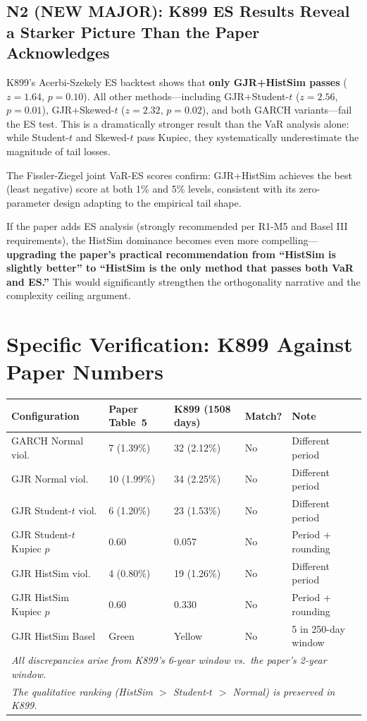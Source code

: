 \documentclass[12pt,a4paper]{article}
\begin{document}
\subsection*{\textcolor{warncolor}{N2 (NEW MAJOR): K899 ES Results Reveal a Starker Picture Than the Paper Acknowledges}}

K899's Acerbi-Szekely ES backtest shows that \textbf{only GJR+HistSim passes} ($z = 1.64$, $p = 0.10$). All other methods---including GJR+Student-$t$ ($z = 2.56$, $p = 0.01$), GJR+Skewed-$t$ ($z = 2.32$, $p = 0.02$), and both GARCH variants---fail the ES test. This is a dramatically stronger result than the VaR analysis alone: while Student-$t$ and Skewed-$t$ pass Kupiec, they systematically underestimate the magnitude of tail losses.

The Fissler-Ziegel joint VaR-ES scores confirm: GJR+HistSim achieves the best (least negative) score at both 1\% and 5\% levels, consistent with its zero-parameter design adapting to the empirical tail shape.

If the paper adds ES analysis (strongly recommended per R1-M5 and Basel III requirements), the HistSim dominance becomes even more compelling---\textbf{upgrading the paper's practical recommendation from ``HistSim is slightly better'' to ``HistSim is the only method that passes both VaR and ES.''} This would significantly strengthen the orthogonality narrative and the complexity ceiling argument.


\bigskip

\section*{Specific Verification: K899 Against Paper Numbers}

\begin{longtable}{p{3.5cm}p{2.5cm}p{2.5cm}p{2cm}p{3cm}}
\toprule
\textbf{Configuration} & \textbf{Paper Table~5} & \textbf{K899 (1508 days)} & \textbf{Match?} & \textbf{Note} \\
\midrule
\endfirsthead
GARCH Normal viol. & 7 (1.39\%) & 32 (2.12\%) & No & Different period \\
GJR Normal viol. & 10 (1.99\%) & 34 (2.25\%) & No & Different period \\
GJR Student-$t$ viol. & 6 (1.20\%) & 23 (1.53\%) & No & Different period \\
GJR Student-$t$ Kupiec $p$ & 0.60 & 0.057 & No & Period + rounding \\
GJR HistSim viol. & 4 (0.80\%) & 19 (1.26\%) & No & Different period \\
GJR HistSim Kupiec $p$ & 0.60 & 0.330 & No & Period + rounding \\
GJR HistSim Basel & Green & Yellow & No & 5 in 250-day window \\
\midrule
\multicolumn{5}{l}{\textit{All discrepancies arise from K899's 6-year window vs.\ the paper's 2-year window.}} \\
\multicolumn{5}{l}{\textit{The qualitative ranking (HistSim $>$ Student-$t$ $>$ Normal) is preserved in K899.}} \\
\bottomrule
\end{longtable}
\end{document}
